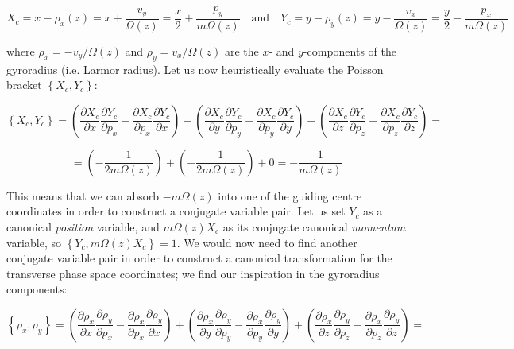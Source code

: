 \begin{equation}
    X_c=x-\rho_x(z)=x+\frac{v_y}{\Omega(z)}=\frac{x}{2}+\frac{p_y}{m\Omega(z)}\quad\text{and}\quad Y_c=y-\rho_y(z)=y-\frac{v_x}{\Omega(z)}=\frac{y}{2}-\frac{p_x}{m\Omega(z)}
\end{equation}

where $\rho_x=-v_y/\Omega(z)$ and $\rho_y=v_x/\Omega(z)$ are the $x$- and $y$-components of the gyroradius (i.e. Larmor radius). Let us now heuristically evaluate the Poisson bracket $\left\{X_c,Y_c\right\}$:

\begin{equation*}
    \left\{X_c,Y_c\right\}=\left(\frac{\partial X_c}{\partial x}\frac{\partial Y_c}{\partial p_x}-\frac{\partial X_c}{\partial p_x}\frac{\partial Y_c}{\partial x}\right)+\left(\frac{\partial X_c}{\partial y}\frac{\partial Y_c}{\partial p_y}-\frac{\partial X_c}{\partial p_y}\frac{\partial Y_c}{\partial y}\right)+\left(\frac{\partial X_c}{\partial z}\frac{\partial Y_c}{\partial p_z}-\frac{\partial X_c}{\partial p_z}\frac{\partial Y_c}{\partial z}\right)=
\end{equation*}

\begin{equation*}
    =\left(-\frac{1}{2m\Omega(z)}\right)+\left(-\frac{1}{2m\Omega(z)}\right)+0=-\frac{1}{m\Omega(z)}
\end{equation*}

This means that we can absorb $-m\Omega(z)$ into one of the guiding centre coordinates in order to construct a conjugate variable pair. Let us set $Y_c$ as a canonical \textit{position} variable, and $m\Omega(z)X_c$ as its conjugate canonical \textit{momentum} variable, so $\left\{Y_c, m\Omega(z)X_c\right\}=1$. We would now need to find another conjugate variable pair in order to construct a canonical transformation for the transverse phase space coordinates; we find our inspiration in the gyroradius components:

\begin{equation*}
    \left\{\rho_x,\rho_y\right\}=\left(\frac{\partial \rho_x}{\partial x}\frac{\partial \rho_y}{\partial p_x}-\frac{\partial \rho_x}{\partial p_x}\frac{\partial \rho_y}{\partial x}\right)+\left(\frac{\partial \rho_x}{\partial y}\frac{\partial \rho_y}{\partial p_y}-\frac{\partial \rho_x}{\partial p_y}\frac{\partial \rho_y}{\partial y}\right)+\left(\frac{\partial \rho_x}{\partial z}\frac{\partial \rho_y}{\partial p_z}-\frac{\partial \rho_x}{\partial p_z}\frac{\partial \rho_y}{\partial z}\right)=
\end{equation*}

